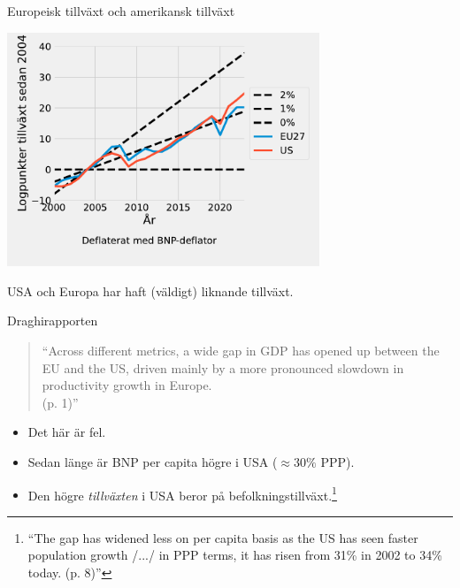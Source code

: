 \documentclass{beamer}
\begin{document}
\begin{frame}{Europeisk tillväxt och amerikansk tillväxt}
    \begin{center}
        \includegraphics[width=0.7\textwidth]{figures/GDP_growth0_world.pdf}
    \end{center}

    \bigskip
    \footnotesize
    USA och Europa har haft (väldigt) liknande tillväxt.
\end{frame}

\begin{frame}{Draghirapporten}
    \begin{quote}
        ``Across different metrics, a wide gap in GDP has opened up between the EU and the US, driven mainly by a more pronounced slowdown in productivity growth in Europe. \\(p. 1)'' %
    \end{quote}

    \bigskip

    \begin{itemize}
        \item Det här är fel.
        \item Sedan länge är BNP per capita högre i USA ($\approx 30\%$ PPP).
        \item Den högre \emph{tillväxten} i USA beror på befolkningstillväxt.\footnote{``The gap has widened less on per capita basis as the US has seen faster population growth /.../ in PPP terms, it has risen from 31\% in 2002 to 34\% today. (p. 8)''}
    \end{itemize}
\end{frame}
\end{document}
